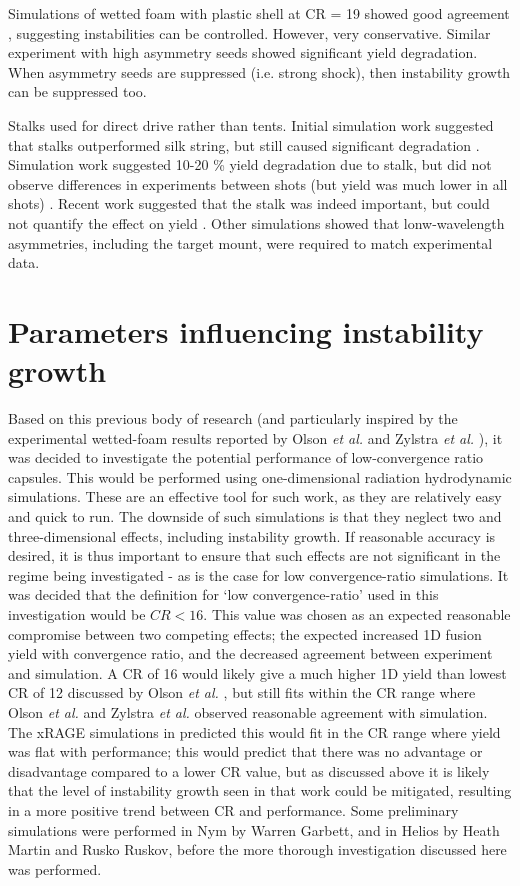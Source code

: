 Simulations of wetted foam with plastic shell at CR = 19 showed good agreement \cite{Haines2019a}, suggesting instabilities can be controlled. However, very conservative. Similar experiment with high asymmetry seeds showed significant yield degradation. When asymmetry seeds are suppressed (i.e. strong shock), then instability growth can be suppressed too.

Stalks used for direct drive rather than tents. Initial simulation work suggested that stalks outperformed silk string, but still caused significant degradation \cite{Igumenshchev2009}. Simulation work suggested 10-20 \% yield degradation due to stalk, but did not observe differences in experiments between shots (but yield was much lower in all shots) \cite{Shah2017}. Recent work suggested that the stalk was indeed important, but could not quantify the effect on yield \cite{GatuJohnson2020}. Other simulations showed that lonw-wavelength asymmetries, including the target mount, were required to match experimental data.

\section{Parameters influencing instability growth}

Based on this previous body of research (and particularly inspired by the experimental wetted-foam results reported by Olson \textit{et al.} \cite{Olson2016} and Zylstra \textit{et al.} \cite{Zylstra2018}), it was decided to investigate the potential performance of low-convergence ratio capsules. This would be performed using one-dimensional radiation hydrodynamic simulations. These are an effective tool for such work, as they are relatively easy and quick to run. The downside of such simulations is that they neglect two and three-dimensional effects, including instability growth. If reasonable accuracy is desired, it is thus important to ensure that such effects are not significant in the regime being investigated - as is the case for low convergence-ratio simulations. It was decided that the definition for `low convergence-ratio' used in this investigation would be $CR<16$. This value was chosen as an expected reasonable compromise between two competing effects; the expected increased 1D fusion yield with convergence ratio, and the decreased agreement between experiment and simulation. A CR of 16 would likely give a much higher 1D yield than lowest CR of 12 discussed by Olson \textit{et al.} \cite{Olson2016}, but still fits within the CR range where Olson \textit{et al.} \cite{Olson2016} and Zylstra \textit{et al.} \cite{Zylstra2018} observed reasonable agreement with simulation. The xRAGE simulations in \cite{Haines2017a} predicted this would fit in the CR range where yield was flat with performance; this would predict that there was no advantage or disadvantage compared to a lower CR value, but as discussed above it is likely that the level of instability growth seen in that work could be mitigated, resulting in a more positive trend between CR and performance. Some preliminary simulations were performed in Nym by Warren Garbett, and in Helios by Heath Martin and Rusko Ruskov, before the more thorough investigation discussed here was performed.

